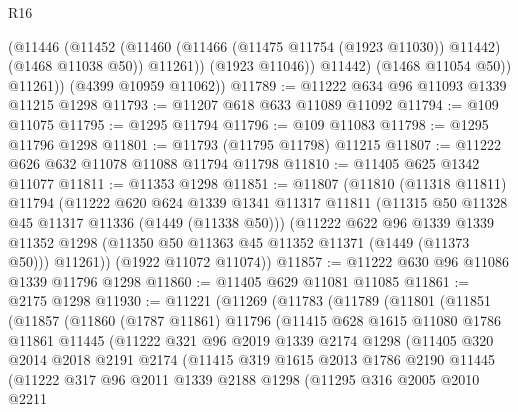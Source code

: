 \begin{lexlean}{R16}
\begin{coremodule}
                (@11446
                  (@11452
                    (@11460 (@11466 (@11475 @11754 (@1923 @11030)) @11442) (@1468 @11038 @50))
                    @11261))
                (@1923 @11046))
              @11442)
            (@1468 @11054 @50))
          @11261))
      (@4399 @10959 @11062))
@11789 := @11222 @634 @96 @11093 @1339 @11215 @1298
@11793 := @11207 @618 @633 @11089 @11092
@11794 := @109 @11075
@11795 := @1295 @11794
@11796 := @109 @11083
@11798 := @1295 @11796 @1298
@11801 := @11793 (@11795 @11798) @11215
@11807 := @11222 @626 @632 @11078 @11088 @11794 @11798
@11810 := @11405 @625 @1342 @11077
@11811 := @11353 @1298
@11851 := @11807
    (@11810
      (@11318 @11811)
      @11794
      (@11222
        @620
        @624
        @1339
        @1341
        @11317
        @11811
        (@11315 @50 @11328 @45 @11317 @11336 (@1449 (@11338 @50)))
        (@11222
          @622
          @96
          @1339
          @1339
          @11352
          @1298
          (@11350 @50 @11363 @45 @11352 @11371 (@1449 (@11373 @50)))
          @11261))
      (@1922 @11072 @11074))
@11857 := @11222 @630 @96 @11086 @1339 @11796 @1298
@11860 := @11405 @629 @11081 @11085
@11861 := @2175 @1298
@11930 := @11221
    (@11269
      (@11783
        (@11789
          (@11801
            (@11851
              (@11857
                (@11860
                  (@1787 @11861)
                  @11796
                  (@11415
                    @628
                    @1615
                    @11080
                    @1786
                    @11861
                    @11445
                    (@11222
                      @321
                      @96
                      @2019
                      @1339
                      @2174
                      @1298
                      (@11405
                        @320
                        @2014
                        @2018
                        @2191
                        @2174
                        (@11415
                          @319
                          @1615
                          @2013
                          @1786
                          @2190
                          @11445
                          (@11222
                            @317
                            @96
                            @2011
                            @1339
                            @2188
                            @1298
                            (@11295
                              @316
                              @2005
                              @2010
                              @2211

\end{coremodule}
\end{lexlean}
